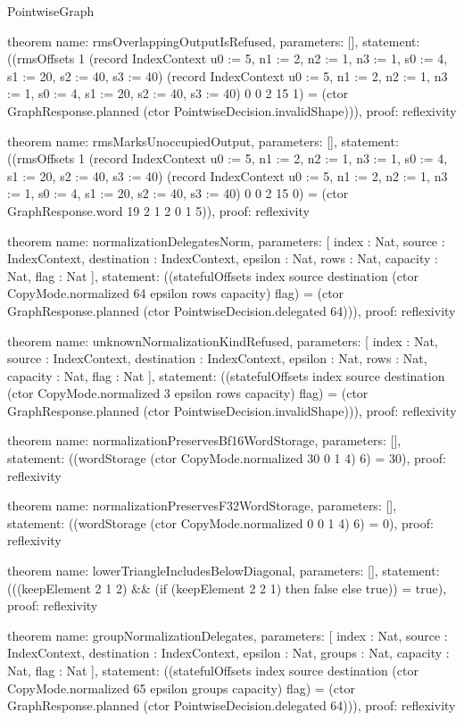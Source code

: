 \begin{lexlean}{PointwiseGraph}
\begin{semanticmodule}
theorem{
  name: rmsOverlappingOutputIsRefused,
  parameters: [],
  statement: ((rmsOffsets 1 (record IndexContext {u0 := 5, n1 := 2, n2 := 1, n3 := 1, s0 := 4, s1 := 20, s2 := 40, s3 := 40}) (record IndexContext {u0 := 5, n1 := 2, n2 := 1, n3 := 1, s0 := 4, s1 := 20, s2 := 40, s3 := 40}) 0 0 2 15 1) = (ctor GraphResponse.planned (ctor PointwiseDecision.invalidShape))),
  proof: reflexivity{}
}

theorem{
  name: rmsMarksUnoccupiedOutput,
  parameters: [],
  statement: ((rmsOffsets 1 (record IndexContext {u0 := 5, n1 := 2, n2 := 1, n3 := 1, s0 := 4, s1 := 20, s2 := 40, s3 := 40}) (record IndexContext {u0 := 5, n1 := 2, n2 := 1, n3 := 1, s0 := 4, s1 := 20, s2 := 40, s3 := 40}) 0 0 2 15 0) = (ctor GraphResponse.word 19 2 1 2 0 1 5)),
  proof: reflexivity{}
}

theorem{
  name: normalizationDelegatesNorm,
  parameters: [
    index : Nat,
    source : IndexContext,
    destination : IndexContext,
    epsilon : Nat,
    rows : Nat,
    capacity : Nat,
    flag : Nat
  ],
  statement: ((statefulOffsets index source destination (ctor CopyMode.normalized 64 epsilon rows capacity) flag) = (ctor GraphResponse.planned (ctor PointwiseDecision.delegated 64))),
  proof: reflexivity{}
}

theorem{
  name: unknownNormalizationKindRefused,
  parameters: [
    index : Nat,
    source : IndexContext,
    destination : IndexContext,
    epsilon : Nat,
    rows : Nat,
    capacity : Nat,
    flag : Nat
  ],
  statement: ((statefulOffsets index source destination (ctor CopyMode.normalized 3 epsilon rows capacity) flag) = (ctor GraphResponse.planned (ctor PointwiseDecision.invalidShape))),
  proof: reflexivity{}
}

theorem{
  name: normalizationPreservesBf16WordStorage,
  parameters: [],
  statement: ((wordStorage (ctor CopyMode.normalized 30 0 1 4) 6) = 30),
  proof: reflexivity{}
}

theorem{
  name: normalizationPreservesF32WordStorage,
  parameters: [],
  statement: ((wordStorage (ctor CopyMode.normalized 0 0 1 4) 6) = 0),
  proof: reflexivity{}
}

theorem{
  name: lowerTriangleIncludesBelowDiagonal,
  parameters: [],
  statement: (((keepElement 2 1 2) && (if (keepElement 2 2 1) then false else true)) = true),
  proof: reflexivity{}
}

theorem{
  name: groupNormalizationDelegates,
  parameters: [
    index : Nat,
    source : IndexContext,
    destination : IndexContext,
    epsilon : Nat,
    groups : Nat,
    capacity : Nat,
    flag : Nat
  ],
  statement: ((statefulOffsets index source destination (ctor CopyMode.normalized 65 epsilon groups capacity) flag) = (ctor GraphResponse.planned (ctor PointwiseDecision.delegated 64))),
  proof: reflexivity{}
}


\end{semanticmodule}
\end{lexlean}
